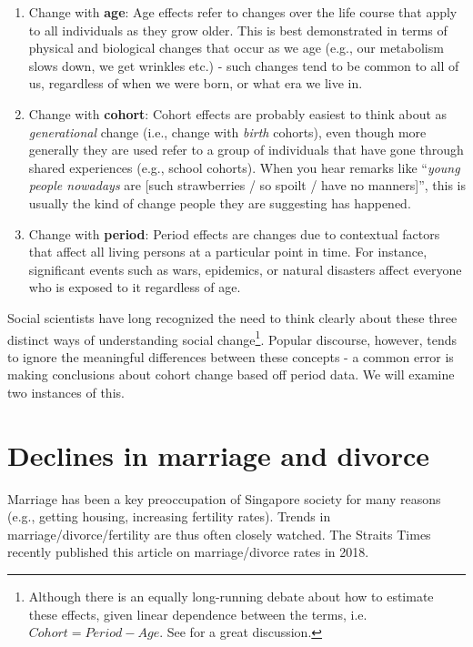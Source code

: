 \documentclass[openany]{book}
\let\rmarkdownfootnote\footnote%
\def\footnote{\protect\rmarkdownfootnote}
\begin{document}
\begin{enumerate}
\def\labelenumi{\arabic{enumi}.}
\item
  Change with \textbf{age}: Age effects refer to changes over the life
  course that apply to all individuals as they grow older. This is best
  demonstrated in terms of physical and biological changes that occur as
  we age (e.g., our metabolism slows down, we get wrinkles etc.) - such
  changes tend to be common to all of us, regardless of when we were
  born, or what era we live in.
\item
  Change with \textbf{cohort}: Cohort effects are probably easiest to
  think about as \emph{generational} change (i.e., change with
  \emph{birth} cohorts), even though more generally they are used refer
  to a group of individuals that have gone through shared experiences
  (e.g., school cohorts). When you hear remarks like ``\emph{young
  people nowadays} are {[}such strawberries / so spoilt / have no
  manners{]}'', this is usually the kind of change people they are
  suggesting has happened.
\item
  Change with \textbf{period}: Period effects are changes due to
  contextual factors that affect all living persons at a particular
  point in time. For instance, significant events such as wars,
  epidemics, or natural disasters affect everyone who is exposed to it
  regardless of age.
\end{enumerate}

Social scientists have long recognized the need to think clearly about
these three distinct ways of understanding social change\footnote{Although
  there is an equally long-running debate about how to estimate these
  effects, given linear dependence between the terms, i.e.
  \(Cohort = Period - Age\). See \citet{fosse_analyzing_2019} for a
  great discussion.}. Popular discourse, however, tends to ignore the
meaningful differences between these concepts - a common error is making
conclusions about cohort change based off period data. We will examine
two instances of this.

\section{Declines in marriage and divorce}\label{marriage-decline}

Marriage has been a key preoccupation of Singapore society for many
reasons (e.g., getting housing, increasing fertility rates). Trends in
marriage/divorce/fertility are thus often closely watched. The Straits
Times recently published this article on marriage/divorce rates in 2018.
\end{document}

